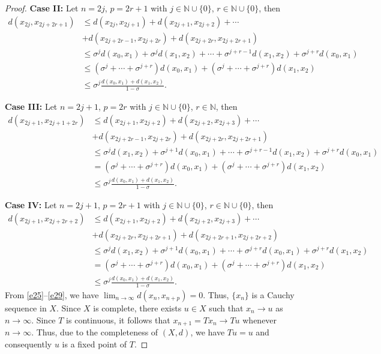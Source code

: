 \documentclass[11pt,reqno,a4paper]{amsart}
\theoremstyle{plain}
\theoremstyle{definition}
\theoremstyle{remark}
\numberwithin{equation}{section}
\begin{document}
\begin{proof}
\textbf{Case II:} Let $n=2j$, $p=2r+1$ with $j \in \mathbb{N} \cup \{0\}$, $r \in \mathbb{N} \cup \{0\}$, then
\begin{align}\label{e27}
d(x_{2j},x_{2j+2r+1})
&\le d(x_{2j},x_{2j+1})+d(x_{2j+1},x_{2j+2})+\cdots\nonumber\\
&+d(x_{2j+2r-1},x_{2j+2r})+d(x_{2j+2r},x_{2j+2r+1})\nonumber\\
&\le \sigma^j d(x_0,x_1)+\sigma^j d(x_1,x_2)+\cdots+\sigma^{j+r-1} d(x_1,x_2)+\sigma^{j+r} d(x_0,x_1)\nonumber\\
&\le (\sigma^j+\cdots+\sigma^{j+r})d(x_0,x_1)+(\sigma^j+\cdots+\sigma^{j+r})d(x_1,x_2)\nonumber\\
&\le \sigma^j \frac{d(x_0,x_1)+d(x_1,x_2)}{1-\sigma}.
\end{align}

\textbf{Case III:} Let $n=2j+1$, $p=2r$ with $j \in \mathbb{N} \cup \{0\}$, $r \in \mathbb{N}$, then
\begin{align}\label{e28}
d(x_{2j+1},x_{2j+1+2r})
&\le d(x_{2j+1},x_{2j+2})+d(x_{2j+2},x_{2j+3})+\cdots\nonumber\\
&+d(x_{2j+2r-1},x_{2j+2r})+d(x_{2j+2r},x_{2j+2r+1})\nonumber\\
&\le \sigma^j d(x_1,x_2)+\sigma^{j+1} d(x_0,x_1)+\cdots+\sigma^{j+r-1} d(x_1,x_2)+\sigma^{j+r} d(x_0,x_1)\nonumber\\
&=(\sigma^j+\cdots+\sigma^{j+r})d(x_0,x_1)+(\sigma^j+\cdots+\sigma^{j+r})d(x_1,x_2)\nonumber\\
&\le \sigma^j \frac{d(x_0,x_1)+d(x_1,x_2)}{1-\sigma}.
\end{align}

\textbf{Case IV:} Let $n=2j+1$, $p=2r+1$ with $j \in \mathbb{N} \cup \{0\}$, $r \in \mathbb{N} \cup \{0\}$, then
\begin{align}\label{e29}
d(x_{2j+1},x_{2j+2r+2})
&\le d(x_{2j+1},x_{2j+2})+d(x_{2j+2},x_{2j+3})+\cdots\nonumber\\
&+d(x_{2j+2r},x_{2j+2r+1})+d(x_{2j+2r+1},x_{2j+2r+2})\nonumber\\
&\le \sigma^j d(x_1,x_2)+\sigma^{j+1} d(x_0,x_1)+\cdots+\sigma^{j+r} d(x_0,x_1)+\sigma^{j+r} d(x_1,x_2)\nonumber\\
&=(\sigma^j+\cdots+\sigma^{j+r})d(x_0,x_1)+(\sigma^j+\cdots+\sigma^{j+r})d(x_1,x_2)\nonumber\\
&\le \sigma^j \frac{d(x_0,x_1)+d(x_1,x_2)}{1-\sigma}.
\end{align}
From \eqref{e25}--\eqref{e29}, we have $\displaystyle \lim_{n \to \infty} d(x_n,x_{n+p})=0$. Thus, $\{x_n\}$ is a Cauchy sequence in $X$. Since $X$ is complete, there exists $u\in X$ such that $x_n \to u$ as $n \to \infty$. Since $T$ is continuous, it follows that $x_{n+1}=Tx_n\to Tu$ whenever $n\to \infty.$ Thus, due to the completeness of $(X,d)$, we have $Tu=u$ and consequently $u$ is a fixed point of $T$. 
\end{proof}
\end{document}
